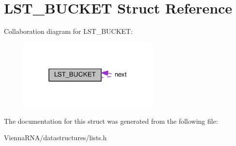 \hypertarget{structLST__BUCKET}{}\section{L\+S\+T\+\_\+\+B\+U\+C\+K\+ET Struct Reference}
\label{structLST__BUCKET}


Collaboration diagram for L\+S\+T\+\_\+\+B\+U\+C\+K\+ET\+:
\nopagebreak
\begin{figure}[H]
\begin{center}
\leavevmode
\includegraphics[width=201pt]{structLST__BUCKET__coll__graph}
\end{center}
\end{figure}


The documentation for this struct was generated from the following file\+:\begin{DoxyCompactItemize}
\item 
Vienna\+R\+N\+A/datastructures/lists.\+h\end{DoxyCompactItemize}
